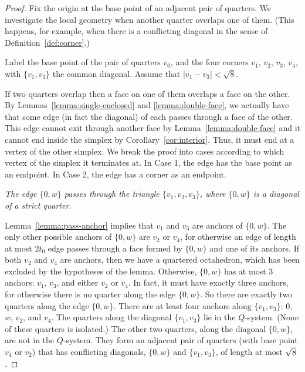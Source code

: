 \begin{proof}
Fix the origin at the base point of an adjacent pair of quarters.
We investigate the local geometry when another quarter overlaps
one of them.  (This happens, for example, when there is a
conflicting diagonal in the sense of Definition~\ref{def:corner}.)


Label the base point of the pair of quarters $v_0$, and the four
corners  $v_1$, $v_2$, $v_3$, $v_4$, with $\{v_1,v_3\}$ the common
diagonal. Assume that $|v_1-v_3|<\sqrt8$.

If two quarters overlap then a face on one of them overlaps a face
on the other.  By Lemmas~\ref{lemma:single-enclosed} and
\ref{lemma:double-face}, we actually have that some edge (in fact
the diagonal) of each passes through a face of the other.  This
edge cannot exit through another face by
Lemma~\ref{lemma:double-face} and it cannot end inside the simplex
by Corollary~\ref{cor:interior}. Thus, it must end at a vertex of
the other simplex.  We break the proof into cases according to
which vertex of the simplex it terminates at. In Case 1, the edge
has the base point as an endpoint.  In Case 2, the edge has a
corner as an endpoint.

 {\it The edge $\{0,w\}$ passes through the
triangle $\{v_1,v_2,v_3\}$, where $\{0,w\}$ is a diagonal of a
strict quarter.}

Lemma~\ref{lemma:pass-anchor} implies that $v_1$ and $v_3$ are
anchors of $\{0,w\}$. The only other possible anchors of $\{0,w\}$
are $v_2$ or $v_4$, for otherwise an edge of length at most $2t_0$
edge passes through a face formed by $\{0,w\}$ and one of its
anchors. If both $v_2$ and $v_4$ are anchors, then we have a
quartered octahedron, which has been excluded by the hypotheses of
the lemma.  Otherwise, $\{0,w\}$ has at most $3$ anchors: $v_1$,
$v_3$, and either $v_2$ or $v_4$. In fact, it must have exactly
three anchors, for otherwise there is no quarter along the edge
$\{0,w\}$. So there are exactly two quarters along the edge
$\{0,w\}$. There are at least four anchors along $\{v_1,v_3\}$:
$0$, $w$, $v_2$, and $v_4$.  The quarters along the diagonal
$\{v_1,v_3\}$ lie in the $Q$-system. (None of these quarters is
isolated.)  The other two quarters, along the diagonal $\{0,w\}$,
are not in the $Q$-system. They form an adjacent pair of quarters
(with base point $v_4$ or $v_2$) that has conflicting diagonals,
$\{0,w\}$ and $\{v_1,v_3\}$, of length at most $\sqrt8$.


\end{proof}
